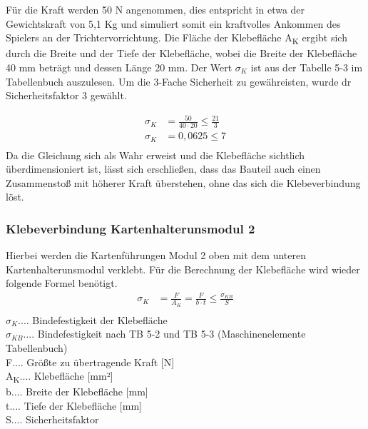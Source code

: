 Für die Kraft werden 50 N angenommen, dies entspricht in etwa der Gewichtskraft von 5,1 Kg
und simuliert somit ein kraftvolles Ankommen des Spielers an der Trichtervorrichtung.
Die Fläche der Klebefläche A\textsubscript{K} ergibt sich durch die Breite und der Tiefe der Klebefläche, wobei
die Breite der Klebefläche  40 mm beträgt und dessen Länge 20 mm.
Der Wert $\sigma_{K}$ ist aus der Tabelle 5-3 im Tabellenbuch  auszulesen.
Um die 3-Fache Sicherheit zu gewähreisten, wurde dr Sicherheitsfaktor 3 gewählt.

\begin{align*}
\sigma _{K} &= \frac{50}{40\cdot 20}\leq \frac{21}{3}\\
\sigma _{K} &= 0,0625\leq 7\\
\end{align*}
Da die Gleichung sich als Wahr erweist und die Klebefläche sichtlich überdimensioniert ist, lässt sich erschließen,
dass das Bauteil auch einen Zusammenstoß mit höherer Kraft überstehen, ohne das sich die Klebeverbindung löst.

\subsubsection{Klebeverbindung Kartenhalterunsmodul 2} \label{subsubsec:KlebMod2}
Hierbei werden die Kartenführungen Modul 2 oben mit dem unteren Kartenhalterunsmodul verklebt.
Für die Berechnung der Klebefläche wird wieder folgende Formel benötigt.
\begin{align*}
\sigma _{K} &= \frac{F}{A_{K}} = \frac{F}{b\cdot t}\leq \frac{\sigma _{KB}}{S}\\
\end{align*}
$\sigma_{K}$.... Bindefestigkeit der Klebefläche \\
$\sigma_{KB}$.... Bindefestigkeit nach TB 5-2 und TB 5-3 (Maschinenelemente Tabellenbuch)\\
F.... Größte zu übertragende Kraft [N]\\
A\textsubscript{K}.... Klebefläche [mm²]\\
b.... Breite der Klebefläche [mm]\\
t.... Tiefe der Klebefläche [mm]\\
S.... Sicherheitsfaktor\\

